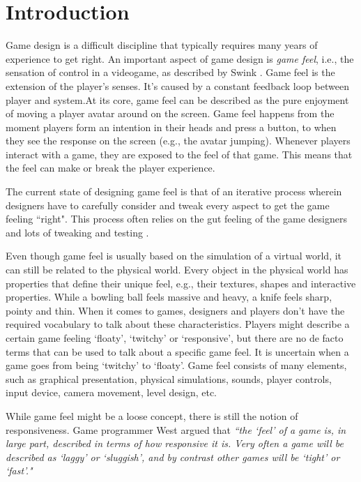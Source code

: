\section{Introduction}
Game design is a difficult discipline that typically requires many years of experience to get right. An important aspect of game design is \textit{game feel}, i.e., the sensation of control in a videogame, as described by Swink \cite{swink}. Game feel is the extension of the player's senses. It's caused by a constant feedback loop between player and system.\newpage At its core, game feel can be described as the pure enjoyment of moving a player avatar around on the screen. Game feel happens from the moment players form an intention in their heads and press a button, to when they see the response on the screen (e.g., the avatar jumping). Whenever players interact with a game, they are exposed to the feel of that game. This means that the feel can make or break the player experience.

The current state of designing game feel is that of an iterative process wherein designers have to carefully consider and tweak every aspect to get the game feeling ``right". This process often relies on the gut feeling of the game designers and lots of tweaking and testing \cite{meatboy1, juicyBeast, platformer_controls}.

Even though game feel is usually based on the simulation of a virtual world, it can still be related to the physical world. Every object in the physical world has properties that define their unique feel, e.g., their textures, shapes and interactive properties. While a bowling ball feels massive and heavy, a knife feels sharp, pointy and thin. When it comes to games, designers and players don't have the required vocabulary to talk about these characteristics. Players might describe a certain game feeling `floaty', `twitchy' or `responsive', but there are no de facto terms that can be used to talk about a specific game feel. It is uncertain when a game goes from being `twitchy' to `floaty'. Game feel consists of many elements, such as graphical presentation, physical simulations, sounds, player controls, input device, camera movement, level design, etc. 

While game feel might be a loose concept, there is still the notion of responsiveness. Game programmer West argued that \textit{``the `feel' of a game is, in large part, described in terms of how responsive it is. Very often a game will be described as `laggy' or `sluggish', and by contrast other games will be `tight' or `fast'."} \cite{measure_lag} 

